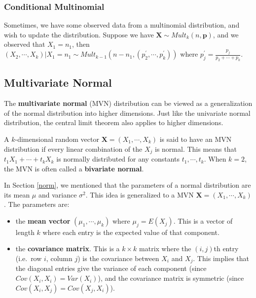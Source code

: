 \documentclass[
]{book}
\begin{document}
\hypertarget{conditional-multinomial}{%
\subsubsection{Conditional Multinomial}\label{conditional-multinomial}}

Sometimes, we have some observed data from a multinomial distribution, and wish to update the distribution. Suppose we have \(\boldsymbol{X} \sim Mult_k(n, \boldsymbol{p})\), and we observed that \(X_1 = n_1\), then \((X_2, \cdots, X_k)|X_1 = n_1 \sim Mult_{k-1}(n-n_1, (p_2^{\prime}, \cdots, p_k^{\prime}))\) where \(p_j^{\prime} = \frac{p_j}{p_2 + \cdots + p_k}\).

\hypertarget{multivariate-normal}{%
\subsection{Multivariate Normal}\label{multivariate-normal}}

The \textbf{multivariate normal} (MVN) distribution can be viewed as a generalization of the normal distribution into higher dimensions. Just like the univariate normal distribution, the central limit theorem also applies to higher dimensions.

A \(k\)-dimensional random vector \(\boldsymbol{X} = (X_1, \cdots, X_k)\) is said to have an MVN distribution if every linear combination of the \(X_j\) is normal. This means that \(t_1 X_1 + \cdots + t_k X_k\) is normally distributed for any constants \(t_1, \cdots, t_k\). When \(k=2\), the MVN is often called a \textbf{bivariate normal}.

In Section \ref{norm}, we mentioned that the parameters of a normal distribution are its mean \(\mu\) and variance \(\sigma^2\). This idea is generalized to a MVN \(\boldsymbol{X} = (X_1, \cdots, X_k)\). The parameters are:

\begin{itemize}
\item
  the \textbf{mean vector} \((\mu_1, \cdots, \mu_k)\) where \(\mu_j = E(X_j)\). This is a vector of length \(k\) where each entry is the expected value of that component.
\item
  the \textbf{covariance matrix}. This is a \(k \times k\) matrix where the \((i,j)\)th entry (i.e.~row \(i\), column \(j\)) is the covariance between \(X_i\) and \(X_j\). This implies that the diagonal entries give the variance of each component (since \(Cov(X_i, X_i) = Var(X_i)\)), and the covariance matrix is symmetric (since \(Cov(X_i, X_j) = Cov(X_j, X_i)\)).
\end{itemize}
\end{document}
